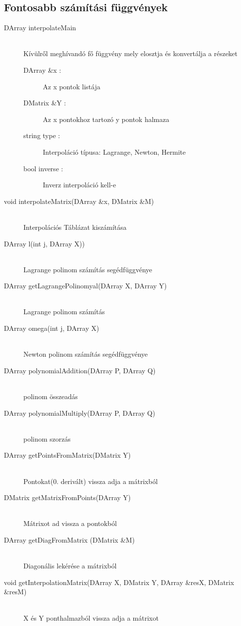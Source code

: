 \subsection{Fontosabb számítási függvények}
	\begin{description}
		\item[DArray interpolateMain] 
			\hfill \\ Kívülről meghívandó fő függvény mely elosztja és konvertálja a részeket
			\begin{description}
			  \item[DArray \&x :] Az x pontok listája 
			  \item[DMatrix \&Y :] Az x pontokhoz tartozó y pontok halmaza
			  \item[string type :] Interpoláció típusa: Lagrange, Newton, Hermite
			  \item[bool inverse :] Inverz interpoláció kell-e
			\end{description}
		\item[void interpolateMatrix(DArray \&x, 	DMatrix \&M)] \hfill \\ 
			Interpolációs Táblázat kiszámítása
		\item[DArray l(int j, DArray X))] \hfill \\ 
			Lagrange polinom számítás segédfüggvénye
		\item[DArray getLagrangePolinomyal(DArray X, DArray Y)] \hfill \\ 
			Lagrange polinom számítás
		\item[DArray omega(int j, DArray X)] \hfill \\ 	   Newton polinom számítás segédfüggvénye
		\item[DArray polynomialAddition(DArray P, DArray Q)] \hfill \\ 
			polinom összeadás
		\item[DArray polynomialMultiply(DArray P, DArray Q)] \hfill \\ 
			polinom szorzás
		\item[DArray getPointsFromMatrix(DMatrix Y)] \hfill \\ 
			Pontokat(0. derivált) vissza adja a mátrixból
		\item[DMatrix getMatrixFromPoints(DArray Y)] \hfill \\ 
			Mátrixot ad vissza a pontokból
		\item[DArray getDiagFromMatrix (DMatrix \&M)] 
		\hfill \\
			Diagonális lekérése a mátrixból
		\item[void getInterpolationMatrix(DArray X, DMatrix Y, DArray \&resX, DMatrix \&resM)] \hfill \\
			 X és Y ponthalmazból vissza adja a mátrixot 
	\end{description}
